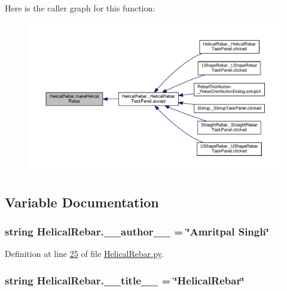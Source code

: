 Here is the caller graph for this function\+:\nopagebreak
\begin{figure}[H]
\begin{center}
\leavevmode
\includegraphics[width=350pt]{namespaceHelicalRebar_a8a4f12ed70819996ac31877957dfab08_icgraph}
\end{center}
\end{figure}




\subsection{Variable Documentation}
\subsubsection[{\texorpdfstring{\+\_\+\+\_\+author\+\_\+\+\_\+}{__author__}}]{\setlength{\rightskip}{0pt plus 5cm}string Helical\+Rebar.\+\_\+\+\_\+author\+\_\+\+\_\+ = \char`\"{}Amritpal Singh\char`\"{}\hspace{0.3cm}{\ttfamily [private]}}\hypertarget{namespaceHelicalRebar_a925dcfed2ffef215413157f48d7b6e57}{}\label{namespaceHelicalRebar_a925dcfed2ffef215413157f48d7b6e57}


Definition at line \hyperlink{HelicalRebar_8py_source_l00025}{25} of file \hyperlink{HelicalRebar_8py_source}{Helical\+Rebar.\+py}.

\subsubsection[{\texorpdfstring{\+\_\+\+\_\+title\+\_\+\+\_\+}{__title__}}]{\setlength{\rightskip}{0pt plus 5cm}string Helical\+Rebar.\+\_\+\+\_\+title\+\_\+\+\_\+ = \char`\"{}Helical\+Rebar\char`\"{}\hspace{0.3cm}{\ttfamily [private]}}\hypertarget{namespaceHelicalRebar_a28c95505364eadd0c2d4abbd80091bef}{}\label{namespaceHelicalRebar_a28c95505364eadd0c2d4abbd80091bef}


